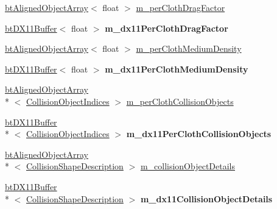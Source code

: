 \begin{DoxyCompactItemize}
\item 
\hyperlink{classbt_aligned_object_array}{bt\+Aligned\+Object\+Array}$<$ float $>$ \hyperlink{classbt_d_x11_soft_body_solver_a0ce074a16d65c6b814ee4fb6ab9ccb27}{m\+\_\+per\+Cloth\+Drag\+Factor}
\item 
\hypertarget{classbt_d_x11_soft_body_solver_aebd1dc0716eed3a873ef999523736146}{\hyperlink{classbt_d_x11_buffer}{bt\+D\+X11\+Buffer}$<$ float $>$ {\bfseries m\+\_\+dx11\+Per\+Cloth\+Drag\+Factor}}\label{classbt_d_x11_soft_body_solver_aebd1dc0716eed3a873ef999523736146}

\item 
\hyperlink{classbt_aligned_object_array}{bt\+Aligned\+Object\+Array}$<$ float $>$ \hyperlink{classbt_d_x11_soft_body_solver_aebb8e95bf8685fed06cd8a66185e066a}{m\+\_\+per\+Cloth\+Medium\+Density}
\item 
\hypertarget{classbt_d_x11_soft_body_solver_a1628944ebe92a5f13f160096e793459b}{\hyperlink{classbt_d_x11_buffer}{bt\+D\+X11\+Buffer}$<$ float $>$ {\bfseries m\+\_\+dx11\+Per\+Cloth\+Medium\+Density}}\label{classbt_d_x11_soft_body_solver_a1628944ebe92a5f13f160096e793459b}

\item 
\hyperlink{classbt_aligned_object_array}{bt\+Aligned\+Object\+Array}\\*
$<$ \hyperlink{structbt_d_x11_soft_body_solver_1_1_collision_object_indices}{Collision\+Object\+Indices} $>$ \hyperlink{classbt_d_x11_soft_body_solver_ac1cc32f59266490db75cd5a6ace3ffe8}{m\+\_\+per\+Cloth\+Collision\+Objects}
\item 
\hypertarget{classbt_d_x11_soft_body_solver_af1a8f4765d1770fc8a4313305f1949e8}{\hyperlink{classbt_d_x11_buffer}{bt\+D\+X11\+Buffer}\\*
$<$ \hyperlink{structbt_d_x11_soft_body_solver_1_1_collision_object_indices}{Collision\+Object\+Indices} $>$ {\bfseries m\+\_\+dx11\+Per\+Cloth\+Collision\+Objects}}\label{classbt_d_x11_soft_body_solver_af1a8f4765d1770fc8a4313305f1949e8}

\item 
\hyperlink{classbt_aligned_object_array}{bt\+Aligned\+Object\+Array}\\*
$<$ \hyperlink{structbt_d_x11_soft_body_solver_1_1_collision_shape_description}{Collision\+Shape\+Description} $>$ \hyperlink{classbt_d_x11_soft_body_solver_a9a817decf988b55a5e93e7562f6ff83f}{m\+\_\+collision\+Object\+Details}
\item 
\hypertarget{classbt_d_x11_soft_body_solver_a9e8b5fee32d95c8def3a69abeaa208b0}{\hyperlink{classbt_d_x11_buffer}{bt\+D\+X11\+Buffer}\\*
$<$ \hyperlink{structbt_d_x11_soft_body_solver_1_1_collision_shape_description}{Collision\+Shape\+Description} $>$ {\bfseries m\+\_\+dx11\+Collision\+Object\+Details}}\label{classbt_d_x11_soft_body_solver_a9e8b5fee32d95c8def3a69abeaa208b0}


\end{DoxyCompactItemize}

